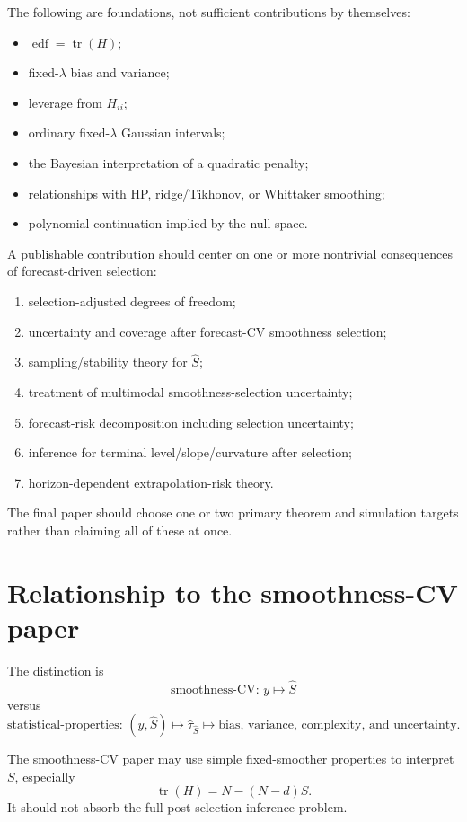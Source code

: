 \documentclass[11pt]{article}
\newcommand{\tr}{\operatorname{tr}}
\begin{document}
The following are foundations, not sufficient contributions by themselves:
\begin{itemize}
\item \(\operatorname{edf}=\tr(H)\);
\item fixed-\(\lambda\) bias and variance;
\item leverage from \(H_{ii}\);
\item ordinary fixed-\(\lambda\) Gaussian intervals;
\item the Bayesian interpretation of a quadratic penalty;
\item relationships with HP, ridge/Tikhonov, or Whittaker smoothing;
\item polynomial continuation implied by the null space.
\end{itemize}

A publishable contribution should center on one or more nontrivial consequences
of forecast-driven selection:
\begin{enumerate}
\item selection-adjusted degrees of freedom;
\item uncertainty and coverage after forecast-CV smoothness selection;
\item sampling/stability theory for \(\widehat S\);
\item treatment of multimodal smoothness-selection uncertainty;
\item forecast-risk decomposition including selection uncertainty;
\item inference for terminal level/slope/curvature after selection;
\item horizon-dependent extrapolation-risk theory.
\end{enumerate}

The final paper should choose one or two primary theorem and simulation targets
rather than claiming all of these at once.

\section{Relationship to the smoothness-CV paper}

The distinction is
\[
\boxed{
\text{smoothness-CV: }
y\longmapsto \widehat S
}
\]
versus
\[
\boxed{
\text{statistical-properties: }
(y,\widehat S)
\longmapsto
\widehat\tau_{\widehat S}
\longmapsto
\text{bias, variance, complexity, and uncertainty}.
}
\]

The smoothness-CV paper may use simple fixed-smoother properties to interpret
\(S\), especially
\[
\tr(H)=N-(N-d)S.
\]
It should not absorb the full post-selection inference problem.
\end{document}
